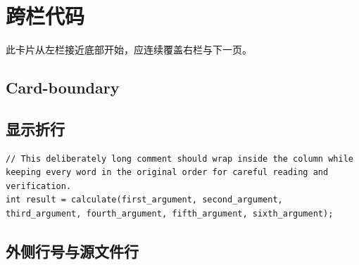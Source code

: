 \section{跨栏代码}
此卡片从左栏接近底部开始，应连续覆盖右栏与下一页。
\vspace*{.65\textheight}
\subsection{Card-boundary}
\subsection{显示折行}
\begin{verbatim}
// This deliberately long comment should wrap inside the column while keeping every word in the original order for careful reading and verification.
int result = calculate(first_argument, second_argument, third_argument, fourth_argument, fifth_argument, sixth_argument);
\end{verbatim}
\subsection{外侧行号与源文件行}
